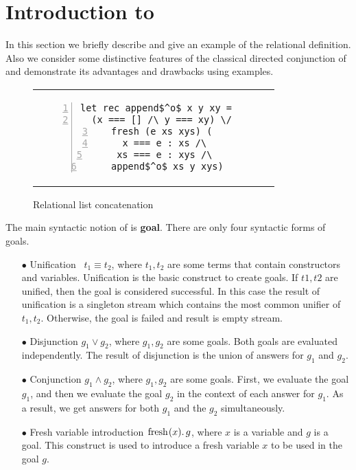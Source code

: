 \section{Introduction to \mk}
\label{sec:directed}

In this section we briefly describe \mk and give an example of the relational definition. Also we consider some distinctive features of the classical directed
conjunction of \mk and demonstrate its advantages and drawbacks using examples. 

\begin{figure}[b]
\centering
\begin{tabular}{c}
\begin{lstlisting}[numbers=left,numberstyle=\small]
let rec append$^o$ x y xy =
  (x === [] /\ y === xy) \/
  fresh (e xs xys) (
    x === e : xs /\ 
    xs === e : xys /\ 
    append$^o$ xs y xys)
\end{lstlisting}
\end{tabular}
\caption{Relational list concatenation}
\label{fair:lst-appendo}
\vspace{-5mm}
\end{figure}

The main syntactic notion of \mk is \textbf{goal}. There are only four syntactic forms of goals.

\begin{itemize}
\item[$\bullet$] Unification~\cite{fair:unify} $t_1 \equiv t_2$, where $t_1, t_2$ are some terms that contain constructors and variables. Unification is the basic
  construct to create goals. If $t1, t2$ are unified, then the goal is considered successful. In this case the result of unification is a singleton stream which
  contains the most common unifier of $t_1, t_2$. Otherwise, the goal is failed and result is empty stream.
\item[$\bullet$] Disjunction $g_1 \lor g_2$, where $g_1, g_2$ are some goals. Both goals are evaluated independently. The result of disjunction is the union of answers for $g_1$ and $g_2$.
\item[$\bullet$] Conjunction $g_1 \land g_2$, where $g_1, g_2$ are some goals. First, we evaluate the goal $g_1$, and then we evaluate the goal $g_2$ in the context of each
  answer for $g_1$. As a result, we get answers for both $g_1$ and the $g_2$ simultaneously.
\item[$\bullet$] Fresh variable introduction \!$\lstinline{fresh} (x). \, g$, where $x$ is a variable and $g$ is a goal. This construct is used to introduce a fresh variable $x$
  to be used in the goal $g$.
\end{itemize}

